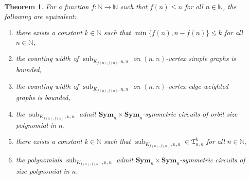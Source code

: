\documentclass[11pt, DIV=15]{scrarticle}
\theoremstyle{definition}
\theoremstyle{plain}
\newtheorem{theorem}[definition]{Theorem}
\theoremstyle{remark}
\DeclareMathOperator{\sub}{sub}
\newcommand{\Sym}{\mathbf{Sym}}
\begin{document}
	\begin{theorem}\label{thm:knn}
		For a function $f \colon \mathbb{N} \to \mathbb{N}$ such that $f(n) \leq n$ for all $n \in \mathbb{N}$,
		the following are equivalent:
		\begin{enumerate}
			\item there exists a constant $k \in \mathbb{N}$ such that $\min\{f(n), n- f(n)\} \leq k$ for all $n \in \mathbb{N}$,\label{it:knn1}
			\item the counting width of $\sub_{K_{f(n), f(n)}, n,n}$ on $(n,n)$-vertex simple graphs is bounded,\label{it:knn2}
			\item the counting width of $\sub_{K_{f(n), f(n)}, n,n}$ on $(n,n)$-vertex edge-weighted graphs is bounded,\label{it:knn3}
			\item the $\sub_{K_{f(n), f(n)}, n,n}$ admit $\Sym_n \times \Sym_n$-symmetric circuits of orbit size polynomial in $n$,\label{it:knn4}
			\item there exists a constant $k \in \mathbb{N}$ such that $\sub_{K_{f(n), f(n)}, n,n} \in \mathfrak{T}^k_{n,n}$ for all $n \in \mathbb{N}$,\label{it:knn5}
			\item the polynomials $\sub_{K_{f(n), f(n)}, n,n}$ admit $\Sym_n \times \Sym_n$-symmetric circuits of size polynomial in $n$.\label{it:knn6}
		\end{enumerate}
	\end{theorem}
\end{document}
